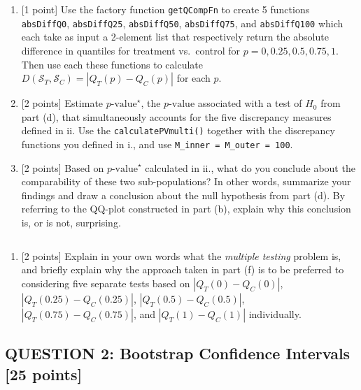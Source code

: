 \documentclass[
]{article}
\providecommand{\tightlist}{%
  \setlength{\itemsep}{0pt}\setlength{\parskip}{0pt}}
\begin{document}
\begin{enumerate}
  \begin{enumerate}
  \def\labelenumii{\roman{enumii}.}
  \item
    {[}1 point{]} Use the factory function \texttt{getQCompFn} to create
    5 functions \texttt{absDiffQ0}, \texttt{absDiffQ25},
    \texttt{absDiffQ50}, \texttt{absDiffQ75}, and \texttt{absDiffQ100}
    which each take as input a 2-element list that respectively return
    the absolute difference in quantiles for treatment vs.~control for
    \(p=0,0.25,0.5,0.75,1\). Then use each these functions to calculate
    \(D(\mathcal{S}_{T},\mathcal{S}_{C}) = |Q_T(p) - Q_C(p)|\) for each
    \(p\).
  \item
    {[}2 points{]} Estimate \(p\text{-value}^{\star}\), the
    \(p\text{-value}\) associated with a test of \(H_0\) from part (d),
    that simultaneously accounts for the five discrepancy measures
    defined in ii. Use the \texttt{calculatePVmulti()} together with the
    discrepancy functions you defined in i., and use
    \texttt{M\_inner\ =\ M\_outer\ =\ 100}.
  \item
    {[}2 points{]} Based on \(p\text{-value}^{\star}\) calculated in
    ii., what do you conclude about the comparability of these two
    sub-populations? In other words, summarize your findings and draw a
    conclusion about the null hypothesis from part (d). By referring to
    the QQ-plot constructed in part (b), explain why this conclusion is,
    or is not, surprising.
  \end{enumerate}
\end{enumerate}

\(\;\)

\begin{enumerate}
\def\labelenumi{(\alph{enumi})}
\setcounter{enumi}{6}
\tightlist
\item
  {[}2 points{]} Explain in your own words what the \emph{multiple
  testing} problem is, and briefly explain why the approach taken in
  part (f) is to be preferred to considering five separate tests based
  on \(|Q_T(0) - Q_C(0)|\), \(|Q_T(0.25) - Q_C(0.25)|\),
  \(|Q_T(0.5) - Q_C(0.5)|\), \(|Q_T(0.75) - Q_C(0.75)|\), and
  \(|Q_T(1) - Q_C(1)|\) individually.
\end{enumerate}

\newpage

\hypertarget{question-2-bootstrap-confidence-intervals-25-points}{%
\subsection{QUESTION 2: Bootstrap Confidence Intervals {[}25
points{]}}\label{question-2-bootstrap-confidence-intervals-25-points}}
\end{document}
